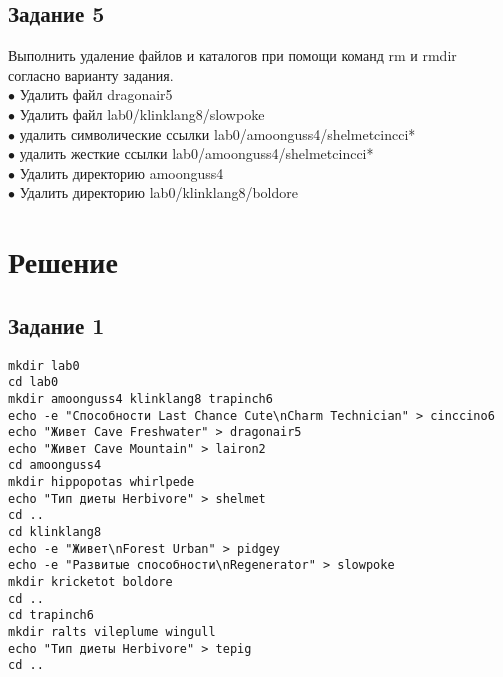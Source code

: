 \subsection*{Задание 5}
Выполнить удаление файлов и каталогов при помощи команд rm и rmdir согласно варианту задания. \\
$\bullet$ Удалить файл dragonair5 \\
$\bullet$ Удалить файл lab0/klinklang8/slowpoke \\
$\bullet$ удалить символические ссылки lab0/amoonguss4/shelmetcincci* \\
$\bullet$ удалить жесткие ссылки lab0/amoonguss4/shelmetcincci* \\
$\bullet$ Удалить директорию amoonguss4 \\
$\bullet$ Удалить директорию lab0/klinklang8/boldore
\newpage
\section*{Решение}
\subsection*{Задание 1}
\verb|mkdir lab0| \\
\verb|cd lab0| \\
\verb|mkdir amoonguss4 klinklang8 trapinch6| \\
\verb|echo -e "Способности Last Chance Cute\nCharm Technician" > cinccino6| \\
\verb|echo "Живет Cave Freshwater" > dragonair5| \\
\verb|echo "Живет Cave Mountain" > lairon2| \\
\verb|cd amoonguss4| \\
\verb|mkdir hippopotas whirlpede| \\
\verb|echo "Тип диеты Herbivore" > shelmet| \\
\verb|cd ..| \\
\verb|cd klinklang8| \\
\verb|echo -e "Живет\nForest Urban" > pidgey| \\
\verb|echo -e "Развитые способности\nRegenerator" > slowpoke| \\
\verb|mkdir kricketot boldore| \\
\verb|cd ..| \\
\verb|cd trapinch6| \\
\verb|mkdir ralts vileplume wingull| \\
\verb|echo "Тип диеты Herbivore" > tepig| \\
\verb|cd ..|
